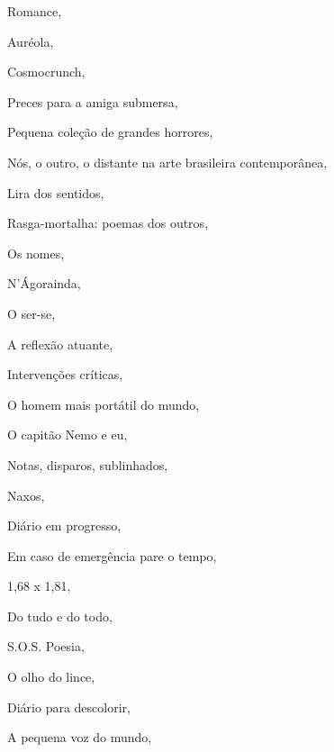 \begin{multicols}{2}
\begin{enumerate}
{\item Romance, {}
\item Auréola, {}
\item Cosmocrunch, {}
\item Preces para a amiga submersa, {}
\item Pequena coleção de grandes horrores, {}
\item Nós, o outro, o distante na arte brasileira contemporânea, {}
\item Lira dos sentidos, {}
\item Rasga-mortalha: poemas dos outros, {}
\item Os nomes, {}
\item N’Ágorainda, {}
\item O ser-se, {}
\item A reflexão atuante, {}
\item Intervenções críticas, {}
\item O homem mais portátil do mundo, {}
\item O capitão Nemo e eu, {}
\item Notas, disparos, sublinhados, {}
\item Naxos, {}
\item Diário em progresso, {}
\item Em caso de emergência pare o tempo, {}
\item 1,68 x 1,81, {}
\item Do tudo e do todo, {}
\item S.O.S. Poesia, {}
\item O olho do lince, {}
\item Diário para descolorir, {}
\item A pequena voz do mundo, {}
}
\end{enumerate}
\end{multicols}
